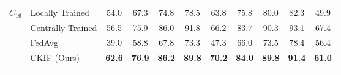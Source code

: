 \begin{table}[t]
\begin{tabular}{llcccc|cccc|c}
    \midrule
    $C_{16}$ & Locally Trained   & 54.0 & 67.3 & 74.8 & 78.5 & 63.8 & 75.8 & 80.0 & 82.3 & 49.9  \\
                   & Centrally Trained & 56.5 & 75.9 & 86.0 & 91.8 & 66.2 & 83.7 & 90.3 & 93.1 & 67.4  \\
                   & FedAvg   & 39.0 & 58.8 & 67.8 & 73.3 & 47.3 & 66.0 & 73.5 & 78.4 & 56.4  \\
                   & CKIF (Ours)     & \textbf{62.6} & \textbf{76.9} & \textbf{86.2} & \textbf{89.8} & \textbf{70.2} & \textbf{84.0} & \textbf{89.8} & \textbf{91.4} & \textbf{61.0} \\
    
    \botrule
    \end{tabular}
\end{table}
